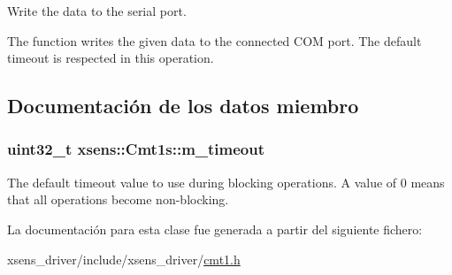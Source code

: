 \-Write the data to the serial port. 

\-The function writes the given data to the connected \-C\-O\-M port. \-The default timeout is respected in this operation. 

\subsection{\-Documentación de los datos miembro}
\hypertarget{classxsens_1_1Cmt1s_a82faa3cd6d194a335b52f0a4b49be46c}{
\subsubsection[{m\-\_\-timeout}]{\setlength{\rightskip}{0pt plus 5cm}uint32\-\_\-t {\bf xsens\-::\-Cmt1s\-::m\-\_\-timeout}}}\label{classxsens_1_1Cmt1s_a82faa3cd6d194a335b52f0a4b49be46c}
\-The default timeout value to use during blocking operations. \-A value of 0 means that all operations become non-\/blocking. 

\-La documentación para esta clase fue generada a partir del siguiente fichero\-:\begin{DoxyCompactItemize}
\item 
xsens\-\_\-driver/include/xsens\-\_\-driver/\hyperlink{cmt1_8h}{cmt1.\-h}\end{DoxyCompactItemize}
